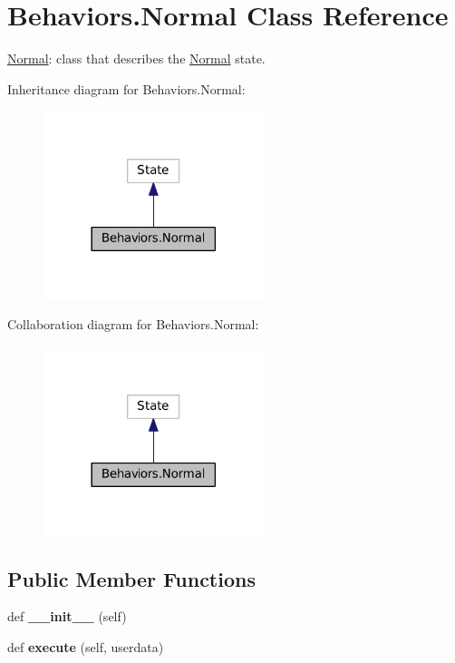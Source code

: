 \hypertarget{classBehaviors_1_1Normal}{}\section{Behaviors.\+Normal Class Reference}
\label{classBehaviors_1_1Normal}


\hyperlink{classBehaviors_1_1Normal}{Normal}\+: class that describes the \hyperlink{classBehaviors_1_1Normal}{Normal} state.  




Inheritance diagram for Behaviors.\+Normal\+:\nopagebreak
\begin{figure}[H]
\begin{center}
\leavevmode
\includegraphics[width=182pt]{classBehaviors_1_1Normal__inherit__graph}
\end{center}
\end{figure}


Collaboration diagram for Behaviors.\+Normal\+:\nopagebreak
\begin{figure}[H]
\begin{center}
\leavevmode
\includegraphics[width=182pt]{classBehaviors_1_1Normal__coll__graph}
\end{center}
\end{figure}
\subsection*{Public Member Functions}
\begin{DoxyCompactItemize}
\item 
def {\bfseries \+\_\+\+\_\+init\+\_\+\+\_\+} (self)\hypertarget{classBehaviors_1_1Normal_a0d48c743470e9356c7eec875add25d1d}{}\label{classBehaviors_1_1Normal_a0d48c743470e9356c7eec875add25d1d}

\item 
def {\bfseries execute} (self, userdata)\hypertarget{classBehaviors_1_1Normal_ad85b58cb3f66b79ca64036abf251d191}{}\label{classBehaviors_1_1Normal_ad85b58cb3f66b79ca64036abf251d191}

\end{DoxyCompactItemize}


